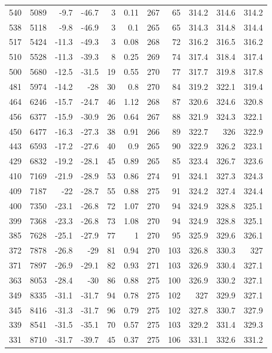 \documentclass{article}
\begin{document}
\begin{longtable}{|r|r|r|r|r|r|r|r|r|r|r}
540 & 5089 & -9.7 & -46.7 & 3 & 0.11 & 267 & 65 & 314.2 & 314.6 & 314.2 \\
538 & 5118 & -9.8 & -46.9 & 3 & 0.1 & 265 & 65 & 314.3 & 314.8 & 314.4 \\
517 & 5424 & -11.3 & -49.3 & 3 & 0.08 & 268 & 72 & 316.2 & 316.5 & 316.2 \\
510 & 5528 & -11.3 & -39.3 & 8 & 0.25 & 269 & 74 & 317.4 & 318.4 & 317.4 \\
500 & 5680 & -12.5 & -31.5 & 19 & 0.55 & 270 & 77 & 317.7 & 319.8 & 317.8 \\
481 & 5974 & -14.2 & -28 & 30 & 0.8 & 270 & 84 & 319.2 & 322.1 & 319.4 \\
464 & 6246 & -15.7 & -24.7 & 46 & 1.12 & 268 & 87 & 320.6 & 324.6 & 320.8 \\
456 & 6377 & -15.9 & -30.9 & 26 & 0.64 & 267 & 88 & 321.9 & 324.3 & 322.1 \\
450 & 6477 & -16.3 & -27.3 & 38 & 0.91 & 266 & 89 & 322.7 & 326 & 322.9 \\
443 & 6593 & -17.2 & -27.6 & 40 & 0.9 & 265 & 90 & 322.9 & 326.2 & 323.1 \\
429 & 6832 & -19.2 & -28.1 & 45 & 0.89 & 265 & 85 & 323.4 & 326.7 & 323.6 \\
410 & 7169 & -21.9 & -28.9 & 53 & 0.86 & 274 & 91 & 324.1 & 327.3 & 324.3 \\
409 & 7187 & -22 & -28.7 & 55 & 0.88 & 275 & 91 & 324.2 & 327.4 & 324.4 \\
400 & 7350 & -23.1 & -26.8 & 72 & 1.07 & 270 & 94 & 324.9 & 328.8 & 325.1 \\
399 & 7368 & -23.3 & -26.8 & 73 & 1.08 & 270 & 94 & 324.9 & 328.8 & 325.1 \\
385 & 7628 & -25.1 & -27.9 & 77 & 1 & 270 & 95 & 325.9 & 329.6 & 326.1 \\
372 & 7878 & -26.8 & -29 & 81 & 0.94 & 270 & 103 & 326.8 & 330.3 & 327 \\
371 & 7897 & -26.9 & -29.1 & 82 & 0.93 & 271 & 103 & 326.9 & 330.4 & 327.1 \\
363 & 8053 & -28.4 & -30 & 86 & 0.88 & 275 & 100 & 326.9 & 330.2 & 327.1 \\
349 & 8335 & -31.1 & -31.7 & 94 & 0.78 & 275 & 102 & 327 & 329.9 & 327.1 \\
345 & 8416 & -31.3 & -31.7 & 96 & 0.79 & 275 & 102 & 327.8 & 330.7 & 327.9 \\
339 & 8541 & -31.5 & -35.1 & 70 & 0.57 & 275 & 103 & 329.2 & 331.4 & 329.3 \\
331 & 8710 & -31.7 & -39.7 & 45 & 0.37 & 275 & 106 & 331.1 & 332.6 & 331.2 \\

\end{longtable}
\end{document}
